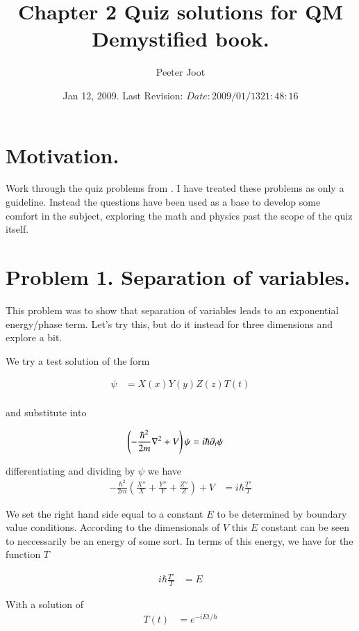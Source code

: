 \documentclass{article}
\title{ Chapter 2 Quiz solutions for QM Demystified book. }
\author{Peeter Joot}
\date{ Jan 12, 2009.  Last Revision: $Date: 2009/01/13 21:48:16 $ }
\begin{document}
\maketitle{}
\tableofcontents
\section{ Motivation. }

Work through the quiz problems from \cite{mcmahon2005qmd}.  I have treated these problems as only a guideline.  Instead the questions have been used as a
base to develop some comfort in the subject, exploring the math and physics past the scope of the quiz itself.

\section{ Problem 1. Separation of variables. }

This problem was to show that separation of variables leads to an exponential energy/phase
term.  Let's try this, but do it instead for three dimensions and explore a bit.

We try a test solution of the form

\begin{align*}
\psi &= X(x) Y(y) Z(z) T(t) \\
\end{align*}

and substitute into 

\begin{align*}
\left(-\frac{\hbar^2}{2m}\nabla^2 + V\right) \psi &= i \hbar \partial_t \psi
\end{align*}

differentiating and dividing by $\psi$ we have
\begin{align*}
-\frac{\hbar^2}{2m}
\left(
\frac{X''}{X}
+\frac{Y''}{Y}
+\frac{Z''}{Z}
\right)
 + V &= i \hbar \frac{T'}{T}
\end{align*}

We set the right hand side equal to a constant $E$ to be determined by boundary value conditions.
According to the dimensionals of $V$ this $E$ constant can be seen to neccessarily be an energy
of some sort.  In terms of this energy, we have for the function $T$

\begin{align*}
i \hbar \frac{T'}{T} &= E
\end{align*}

With a solution of
\begin{align*}
T(t) &= e^{-i E t/\hbar}
\end{align*}
\end{document}
